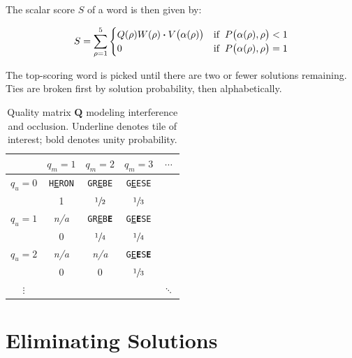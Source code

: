 \documentclass[twocolumn]{tudelft-aiaa}
\begin{document}
The scalar score $S$ of a word is then given by:

\begin{equation}
\label{equation_p_vs_v}
S = \sum_{\rho=1}^{5}\begin{cases} 
	Q(\rho) W(\rho) \boldsymbol{\cdot} V\big(\alpha(\rho)\big) & \text{if} \hspace{2mm} P\big(\alpha(\rho),\rho\big)<1\\
	0 & \text{if} \hspace{2mm} P\big(\alpha(\rho),\rho\big)=1\\
   \end{cases}
\end{equation}

The top-scoring word is picked until there are two or fewer solutions remaining. Ties are broken first by solution probability, then alphabetically.

\begin{table}[h!]
\begin{centering}
\begin{tabular}{c || c | c | c | c}
& $q_m=1$ & $q_m=2$ & $q_m=3$ & $\cdots$ \\
\hline \hline
$q_u=0$ & \texttt{H\underline{E}RON} & \texttt{GR\underline{E}BE} & \texttt{G\underline{E}ESE} & \\
 & 1 & $\sfrac{1}{2}$ & $\sfrac{1}{3}$ & \\
\hline
$q_u=1$ & \emph{n/a}  & \texttt{GR\underline{E}B\textbf{E}} & \texttt{G\underline{E}\textbf{E}SE} & \\
 & 0 & $\sfrac{1}{4}$ & $\sfrac{1}{4}$ & \\
\hline
$q_u=2$ & \emph{n/a} & \emph{n/a} & \texttt{G\underline{E}\textbf{E}S\textbf{E}} & \\
 & 0 & 0 & $\sfrac{1}{3}$ & \\
\hline
$\vdots$ & & & & $\ddots$ \\
\end{tabular}
\vspace{2 mm}
\caption{Quality matrix $\boldsymbol{Q}$ modeling interference and occlusion. \rm Underline denotes tile of interest; bold denotes unity probability.}
\label{table_Q_matrix}
\end{centering}
\end{table}

\section{Eliminating Solutions}
\end{document}
